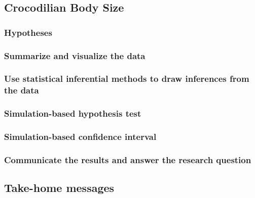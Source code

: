 \documentclass[
]{report}
\begin{document}
\subsection{Crocodilian Body Size}\label{crocodilian-body-size}

\subsubsection*{Hypotheses}\label{hypotheses-3}

\subsubsection*{Summarize and visualize the data}\label{summarize-and-visualize-the-data-5}

\subsubsection*{Use statistical inferential methods to draw inferences from the data}\label{use-statistical-inferential-methods-to-draw-inferences-from-the-data-8}

\subsubsection*{Simulation-based hypothesis test}\label{simulation-based-hypothesis-test}

\subsubsection*{Simulation-based confidence interval}\label{simulation-based-confidence-interval-2}

\subsubsection*{Communicate the results and answer the research question}\label{communicate-the-results-and-answer-the-research-question-4}

\subsection{Take-home messages}\label{take-home-messages-26}
\end{document}
